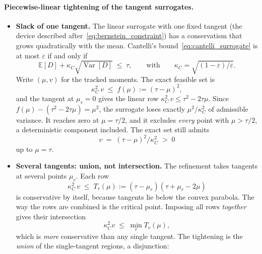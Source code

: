 \documentclass[11pt,a4paper]{article}
\theoremstyle{plain}
\theoremstyle{definition}
\theoremstyle{remark}
\begin{document}
\paragraph{Piecewise-linear tightening of the tangent surrogates.}
\begin{itemize}
  \item \textbf{Slack of one tangent.} The linear surrogate with one fixed tangent (the device described after~\eqref{eq:bernstein_constraint}) has a conservatism that grows quadratically with the mean.
    Cantelli's bound~\eqref{eq:cantelli_surrogate} is at most $\varepsilon$ if and only if
    \begin{equation}
      \mathbb{E}[D] + \kappa_C\sqrt{\operatorname{Var}[D]} \;\le\; \tau,
      \qquad\text{with}\qquad
      \kappa_C = \sqrt{(1-\varepsilon)/\varepsilon}.
    \end{equation}
    Write $(\mu, v)$ for the tracked moments.
    The exact feasible set is
    \begin{equation}
      \kappa_C^2\, v \;\le\; f(\mu) := (\tau - \mu)^2,
    \end{equation}
    and the tangent at $\mu_r = 0$ gives the linear row $\kappa_C^2\, v \le \tau^2 - 2\tau\mu$.
    Since $f(\mu) - (\tau^2 - 2\tau\mu) = \mu^2$, the surrogate loses exactly $\mu^2/\kappa_C^2$ of admissible variance.
    It reaches zero at $\mu = \tau/2$, and it excludes \emph{every} point with $\mu > \tau/2$, a deterministic component included.
    The exact set still admits
    \begin{equation}
      v \;=\; (\tau - \mu)^2/\kappa_C^2 \;>\; 0
    \end{equation}
    up to $\mu = \tau$.
  \item \textbf{Several tangents: union, not intersection.} The refinement takes tangents at several points $\mu_r$.
    Each row
    \begin{equation}
      \kappa_C^2\, v \;\le\; T_r(\mu) := (\tau - \mu_r)(\tau + \mu_r - 2\mu)
    \end{equation}
    is conservative by itself, because tangents lie below the convex parabola.
    The way the rows are combined is the critical point.
    Imposing all rows \emph{together} gives their intersection
    \begin{equation}
      \kappa_C^2 v \;\le\; \min_r T_r(\mu),
    \end{equation}
    which is \emph{more} conservative than any single tangent.
    The tightening is the \emph{union} of the single-tangent regions, a disjunction:
    \begin{equation}

\end{equation}
\end{itemize}
\end{document}
